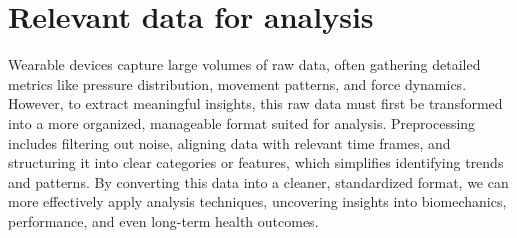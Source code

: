\newpage

\section{Relevant data for analysis}
\label{sec:relevant_data_for_analysis}

Wearable devices capture large volumes of raw data, often gathering detailed metrics like pressure distribution, movement patterns, and force dynamics. However, to extract meaningful 
insights, this raw data must first be transformed into a more organized, manageable format suited for analysis. Preprocessing includes filtering out noise, aligning data with relevant 
time frames, and structuring it into clear categories or features, which simplifies identifying trends and patterns. By converting this data into a cleaner, standardized format, we can 
more effectively apply analysis techniques, uncovering insights into biomechanics, performance, and even long-term health outcomes.






